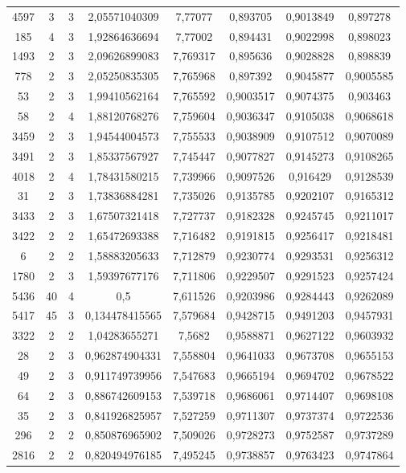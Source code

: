 \begin{longtable}{|c|c|c|c|c|c|c|c|}
4597 & 3 & 3 & 2,05571040309 & 7,77077 & 0,893705 & 0,9013849 & 0,897278 \\
185 & 4 & 3 & 1,92864636694 & 7,77002 & 0,894431 & 0,9022998 & 0,898023 \\
1493 & 2 & 3 & 2,09626899083 & 7,769317 & 0,895636 & 0,9028828 & 0,898839 \\
778 & 2 & 3 & 2,05250835305 & 7,765968 & 0,897392 & 0,9045877 & 0,9005585 \\
53 & 2 & 3 & 1,99410562164 & 7,765592 & 0,9003517 & 0,9074375 & 0,903463 \\
58 & 2 & 4 & 1,88120768276 & 7,759604 & 0,9036347 & 0,9105038 & 0,9068618 \\
3459 & 2 & 3 & 1,94544004573 & 7,755533 & 0,9038909 & 0,9107512 & 0,9070089 \\
3491 & 2 & 3 & 1,85337567927 & 7,745447 & 0,9077827 & 0,9145273 & 0,9108265 \\
4018 & 2 & 4 & 1,78431580215 & 7,739966 & 0,9097526 & 0,916429 & 0,9128539 \\
31 & 2 & 3 & 1,73836884281 & 7,735026 & 0,9135785 & 0,9202107 & 0,9165312 \\
3433 & 2 & 3 & 1,67507321418 & 7,727737 & 0,9182328 & 0,9245745 & 0,9211017 \\
3422 & 2 & 2 & 1,65472693388 & 7,716482 & 0,9191815 & 0,9256417 & 0,9218481 \\
6 & 2 & 2 & 1,58883205633 & 7,712879 & 0,9230774 & 0,9293531 & 0,9256312 \\
1780 & 2 & 3 & 1,59397677176 & 7,711806 & 0,9229507 & 0,9291523 & 0,9257424 \\
5436 & 40 & 4 & 0,5 & 7,611526 & 0,9203986 & 0,9284443 & 0,9262089 \\
5417 & 45 & 3 & 0,134478415565 & 7,579684 & 0,9428715 & 0,9491203 & 0,9457931 \\
3322 & 2 & 2 & 1,04283655271 & 7,5682 & 0,9588871 & 0,9627122 & 0,9603932 \\
28 & 2 & 3 & 0,962874904331 & 7,558804 & 0,9641033 & 0,9673708 & 0,9655153 \\
49 & 2 & 3 & 0,911749739956 & 7,547683 & 0,9665194 & 0,9694702 & 0,9678522 \\
64 & 2 & 3 & 0,886742609153 & 7,539718 & 0,9686061 & 0,9714407 & 0,9698108 \\
35 & 2 & 3 & 0,841926825957 & 7,527259 & 0,9711307 & 0,9737374 & 0,9722536 \\
296 & 2 & 2 & 0,850876965902 & 7,509026 & 0,9728273 & 0,9752587 & 0,9737289 \\
2816 & 2 & 2 & 0,820494976185 & 7,495245 & 0,9738857 & 0,9763423 & 0,9747864 \\

\end{longtable}
